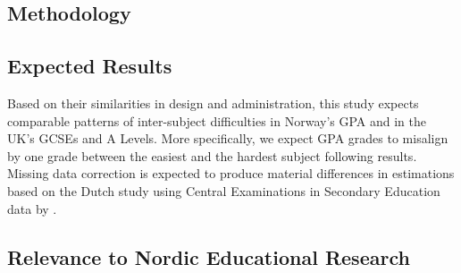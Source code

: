 \subsection{Methodology}



\subsection{Expected Results}

Based on their similarities in design and administration, this study expects comparable patterns of inter-subject difficulties in Norway's GPA and in the UK's GCSEs and A Levels. More specifically, we expect GPA grades to misalign by one grade between the easiest and the hardest subject following  results. Missing data correction is expected to produce material differences in estimations based on the Dutch study using Central Examinations in Secondary Education data by \textcite{korobko:2008}.

\subsection{Relevance to Nordic Educational Research}
